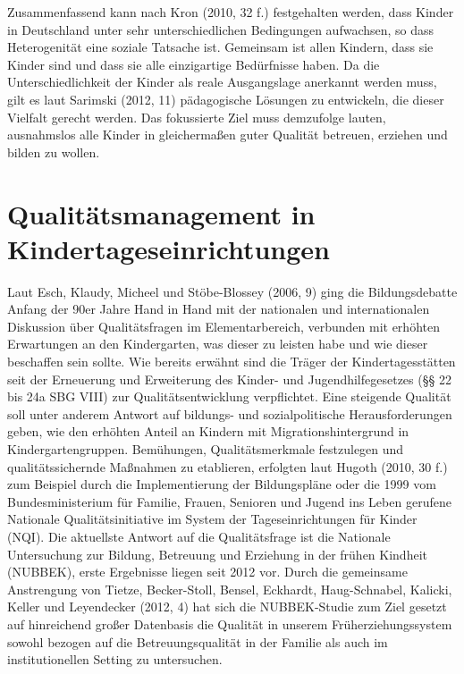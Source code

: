 Zusammenfassend kann nach Kron (2010, 32 f.) festgehalten werden, dass Kinder in Deutschland unter sehr unterschiedlichen Bedingungen aufwachsen, so dass Heterogenität eine soziale Tatsache ist. 
Gemeinsam ist allen Kindern, dass sie Kinder sind und dass sie alle einzigartige Bedürfnisse haben. 
Da die Unterschiedlichkeit der Kinder als reale Ausgangslage anerkannt werden muss, gilt es laut Sarimski (2012, 11) pädagogische Lösungen zu entwickeln, die dieser Vielfalt gerecht werden. Das fokussierte Ziel muss demzufolge lauten, ausnahmslos alle Kinder in gleichermaßen guter Qualität betreuen, erziehen und bilden zu wollen.  

\section{Qualitätsmanagement in Kindertageseinrichtungen}

Laut Esch, Klaudy, Micheel und Stöbe-Blossey (2006, 9) ging die Bildungsdebatte Anfang der 90er Jahre Hand in Hand mit der nationalen und internationalen Diskussion über Qualitätsfragen im Elementarbereich, verbunden mit erhöhten Erwartungen an den Kindergarten, was dieser zu leisten habe und wie dieser beschaffen sein sollte. Wie bereits erwähnt sind die Träger der Kindertagesstätten seit der Erneuerung und Erweiterung des Kinder- und Jugendhilfegesetzes (§§ 22 bis 24a SBG VIII) zur Qualitätsentwicklung verpflichtet. Eine steigende Qualität soll unter anderem Antwort auf bildungs- und sozialpolitische Herausforderungen geben, wie den erhöhten Anteil an Kindern mit Migrationshintergrund in Kindergartengruppen.
Bemühungen, Qualitätsmerkmale festzulegen und qualitätssichernde Maßnahmen zu etablieren, erfolgten laut Hugoth (2010, 30 f.) zum Beispiel durch die Implementierung der Bildungspläne oder die 1999 vom Bundesministerium für Familie, Frauen, Senioren und Jugend ins Leben gerufene Nationale Qualitätsinitiative im System der Tageseinrichtungen für Kinder (NQI). Die aktuellste Antwort auf die Qualitätsfrage ist die Nationale Untersuchung zur Bildung, Betreuung und Erziehung in der frühen Kindheit (NUBBEK), erste Ergebnisse liegen seit 2012 vor. Durch die gemeinsame Anstrengung von Tietze, Becker-Stoll, Bensel, Eckhardt, Haug-Schnabel, Kalicki, Keller und Leyendecker (2012, 4) hat sich die  NUBBEK-Studie zum Ziel gesetzt auf hinreichend großer Datenbasis die Qualität in unserem Früherziehungssystem sowohl bezogen auf die Betreuungsqualität in der Familie als auch im institutionellen Setting zu untersuchen. 
  
